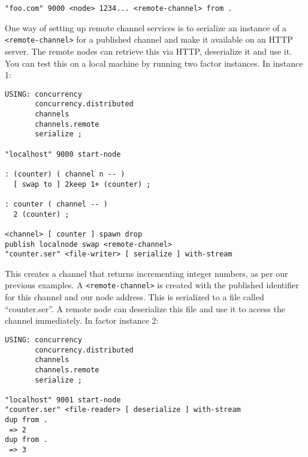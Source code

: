 \begin{verbatim}
"foo.com" 9000 <node> 1234... <remote-channel> from .
\end{verbatim}

One way of setting up remote channel services is to serialize an instance of a \texttt{<remote-channel>} for a published channel and make it available on an HTTP server. The remote nodes can retrieve this via HTTP, deserialize it and use it. You can test this on a local machine by running two factor instances. In instance 1:

\begin{verbatim}
USING: concurrency 
       concurrency.distributed 
       channels 
       channels.remote 
       serialize ;

"localhost" 9000 start-node 

: (counter) ( channel n -- )
  [ swap to ] 2keep 1+ (counter) ;
    
: counter ( channel -- )
  2 (counter) ;    

<channel> [ counter ] spawn drop 
publish localnode swap <remote-channel>
"counter.ser" <file-writer> [ serialize ] with-stream
\end{verbatim}

This creates a channel that returns incrementing integer numbers, as per our previous examples. A \texttt{<remote-channel>} is created with the published identifier for this channel and our node address. This is serialized to a file called ``counter.ser''. A remote node can deserialize this file and use it to access the channel immediately. In factor instance 2:

\begin{verbatim}
USING: concurrency 
       concurrency.distributed 
       channels 
       channels.remote 
       serialize ;

"localhost" 9001 start-node 
"counter.ser" <file-reader> [ deserialize ] with-stream
dup from .
 => 2
dup from .
 => 3
\end{verbatim}
